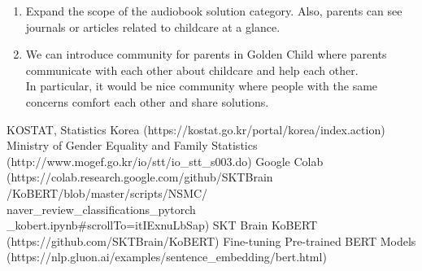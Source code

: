 \documentclass[conference]{IEEEtran}
\begin{document}
\begin{enumerate}
    \hfill\break
    \item Expand the scope of the audiobook solution category. Also, parents can see journals or articles related to childcare at a glance.
    \hfill\break
    \item We can introduce community for parents in Golden Child where parents communicate with each other about childcare and help each other.\\In particular, it would be nice community where people with the same concerns comfort each other and share solutions. 
    \hfill\break
\end{enumerate}

\clearpage

\begin{thebibliography}{00}
 KOSTAT, Statistics Korea (https://kostat.go.kr/portal/korea/index.action)
 Ministry of Gender Equality and Family Statistics \\(http://www.mogef.go.kr/io/stt/io\_stt\_s003.do)
 Google Colab (https://colab.research.google.com/github/SKTBrain\\/KoBERT/blob/master/scripts/NSMC/\\naver\_review\_classifications\_pytorch\\\_kobert.ipynb\#scrollTo=itIExnuLbSap)
 SKT Brain KoBERT (https://github.com/SKTBrain/KoBERT)
 Fine-tuning Pre-trained BERT Models\\ (https://nlp.gluon.ai/examples/sentence\_embedding/bert.html)
\end{thebibliography}

    
\end{document}
